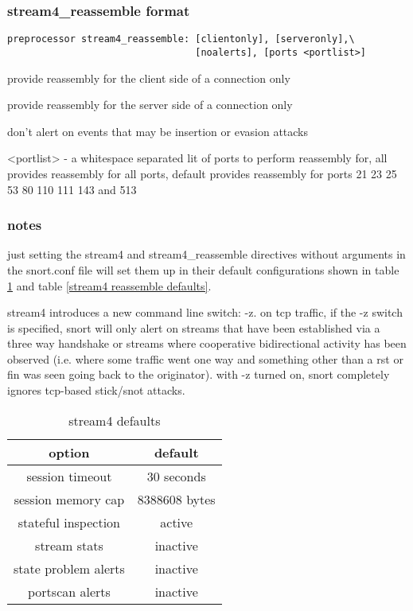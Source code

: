 \documentclass[english]{report}
\begin{document}
\subsubsection{stream4\_reassemble format}

\begin{verbatim}
preprocessor stream4_reassemble: [clientonly], [serveronly],\
                                 [noalerts], [ports <portlist>]
\end{verbatim}
\begin{description}{}
\item [clientonly]provide reassembly for the client side of a connection
only
\item [serveronly]provide reassembly for the server side of a connection
only
\item [noalerts]don't alert on events that may be insertion or evasion
attacks
\item [ports]<portlist> - a whitespace separated lit of ports to perform
reassembly for, all provides reassembly for all
ports, default provides reassembly for ports 21
23 25 53 80 110 111 143 and 513
\end{description}

\subsubsection{notes}

just setting the stream4 and stream4\_reassemble directives without
arguments in the snort.conf file will set them up in their default
configurations shown in table \ref{stream4 defaults} and table \ref{stream4 reassemble defaults}.

stream4 introduces a new command line switch: -z.
on tcp traffic, if the -z switch is specified, snort will only alert
on streams that have been established via a three way handshake or
streams where cooperative bidirectional activity has been observed
(i.e. where some traffic went one way and something other than a rst
or fin was seen going back to the originator). with -z
turned on, snort completely ignores tcp-based stick/snot attacks.

%
\begin{table}[!hbpt]

\caption{stream4 defaults\label{stream4 defaults}}

\begin{center}\begin{tabular}{|c|c|}
\hline 
option&
default\\
\hline
\hline 
session timeout&
30 seconds\\
\hline 
session memory cap&
8388608 bytes\\
\hline 
stateful inspection&
active\\
\hline 
stream stats&
inactive\\
\hline 
state problem alerts&
inactive\\
\hline 
portscan alerts&
inactive\\
\hline
\end{tabular}\end{center}
\end{table}
\end{document}
